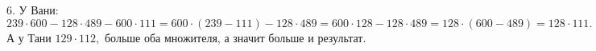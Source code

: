 6. У Вани: $239\cdot600-128\cdot489-600\cdot111=600\cdot(239-111)-128\cdot489=600\cdot128-128\cdot489=128\cdot(600-489)=128\cdot111.$ А у Тани $129\cdot112,$ больше оба множителя, а значит больше и результат.\\
